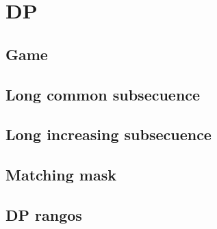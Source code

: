 \section{DP}
\subsection{Game}


\subsection{Long common subsecuence}


\subsection{Long increasing subsecuence}


\subsection{Matching mask}


\subsection{DP rangos}


\newpage
